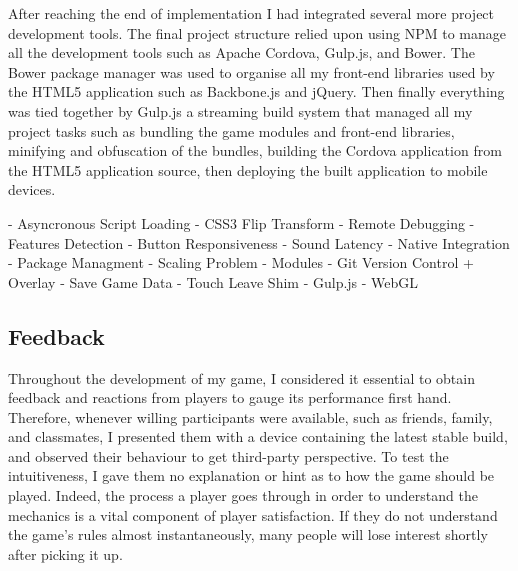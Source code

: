 \documentclass[final]{cmpreport}
\begin{document}
After reaching the end of implementation I had integrated several more project development tools. The final project structure relied upon using NPM to manage all the development tools such as Apache Cordova, Gulp.js, and Bower. The Bower package manager was used to organise all my front-end libraries used by the HTML5 application such as Backbone.js and jQuery. Then finally everything was tied together by Gulp.js a streaming build system that managed all my project tasks such as bundling the game modules and front-end libraries, minifying and obfuscation of the bundles, building the Cordova application from the HTML5 application source, then deploying the built application to mobile devices.

- Asyncronous Script Loading
- CSS3 Flip Transform
- Remote Debugging
- Features Detection
- Button Responsiveness
- Sound Latency
- Native Integration
- Package Managment
- Scaling Problem
- Modules
- Git Version Control + Overlay
- Save Game Data
- Touch Leave Shim
- Gulp.js
- WebGL


\subsection{Feedback}
Throughout the development of my game, I considered it essential to obtain feedback and reactions from players to gauge its performance first hand. Therefore, whenever willing participants were available, such as friends, family, and classmates, I presented them with a device containing the latest stable build, and observed their behaviour to get third-party perspective. To test the intuitiveness, I gave them no explanation or hint as to how the game should be played. Indeed, the process a player goes through in order to understand the mechanics is a vital component of player satisfaction. If they do not understand the game's rules almost instantaneously, many people will lose interest shortly after picking it up.
\end{document}
